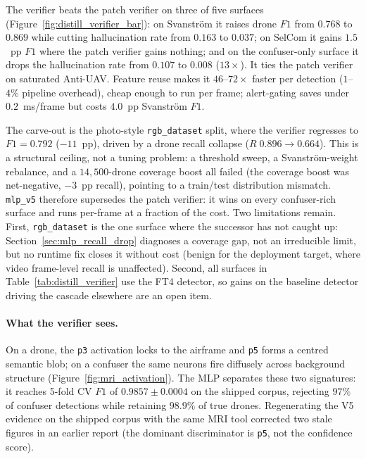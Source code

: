 The verifier beats the patch verifier on three of five surfaces (Figure~\ref{fig:distill_verifier_bar}): on Svanstr\"om it raises drone $F1$ from $0.768$ to $0.869$ while cutting hallucination rate from $0.163$ to $0.037$; on SelCom it gains $1.5$~pp $F1$ where the patch verifier gains nothing; and on the confuser-only surface it drops the hallucination rate from $0.107$ to $0.008$ ($13\times$). It ties the patch verifier on saturated Anti-UAV. Feature reuse makes it $46$--$72\times$ faster per detection ($1$--$4\%$ pipeline overhead), cheap enough to run per frame; alert-gating saves under $0.2$~ms/frame but costs $4.0$~pp Svanstr\"om $F1$.

The carve-out is the photo-style \texttt{rgb\_dataset} split, where the verifier regresses to $F1=0.792$ ($-11$~pp), driven by a drone recall collapse ($R\;0.896 \to 0.664$). This is a structural ceiling, not a tuning problem: a threshold sweep, a Svanstr\"om-weight rebalance, and a $14{,}500$-drone coverage boost all failed (the coverage boost was net-negative, $-3$~pp recall), pointing to a train/test distribution mismatch. \texttt{mlp\_v5} therefore supersedes the patch verifier: it wins on every confuser-rich surface and runs per-frame at a fraction of the cost. Two limitations remain. First, \texttt{rgb\_dataset} is the one surface where the successor has not caught up: Section~\ref{sec:mlp_recall_drop} diagnoses a coverage gap, not an irreducible limit, but no runtime fix closes it without cost (benign for the deployment target, where video frame-level recall is unaffected). Second, all surfaces in Table~\ref{tab:distill_verifier} use the FT4 detector, so gains on the baseline detector driving the cascade elsewhere are an open item.

\paragraph{What the verifier sees.}
On a drone, the \texttt{p3} activation locks to the airframe and \texttt{p5} forms a centred semantic blob; on a confuser the same neurons fire diffusely across background structure (Figure~\ref{fig:mri_activation}). The MLP separates these two signatures: it reaches 5-fold CV $F1$ of $0.9857\pm0.0004$ on the shipped corpus, rejecting $97\%$ of confuser detections while retaining $98.9\%$ of true drones. Regenerating the V5 evidence on the shipped corpus with the same MRI tool corrected two stale figures in an earlier report (the dominant discriminator is \texttt{p5}, not the confidence score).


